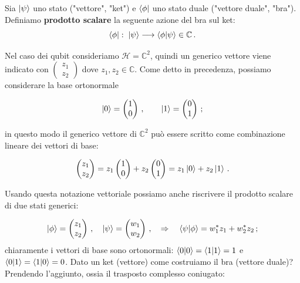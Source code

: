 \begin{definizione}
    Sia $\ket{\psi}$ uno stato ("vettore", "ket") e $\bra{\phi}$ uno stato duale ("vettore duale", "bra"). Definiamo \textbf{prodotto scalare} la seguente azione del bra sul ket: 
    \begin{equation*}
        \bra{\phi}: \; \ket{\psi} \longrightarrow \braket{\phi}{\psi} \in \mathbb{C} \, .
    \end{equation*}
\end{definizione}

\noindent Nel caso dei qubit consideriamo $\mathcal{H} = \mathbb{C}^2$, quindi un generico vettore viene indicato con $\begin{pmatrix} z_1 \\ z_2 \end{pmatrix}$ dove $z_1,z_2\in\mathbb{C}$. Come detto in precedenza, possiamo considerare la base ortonormale

\begin{equation}\label{computational_basis}
    \ket{0} = \begin{pmatrix} 1 \\ 0 \end{pmatrix} \, , \qquad \ket{1} = \begin{pmatrix} 0 \\ 1 \end{pmatrix} \, ;
\end{equation}

\noindent in questo modo il generico vettore di $\mathbb{C}^2$ può essere scritto come combinazione lineare dei vettori di base:

\begin{equation*}
\begin{pmatrix} z_1 \\ z_2 \end{pmatrix} = z_1 \begin{pmatrix} 1 \\ 0 \end{pmatrix} + z_2 \begin{pmatrix} 0 \\ 1 \end{pmatrix} = z_1 \ket{0} + z_2 \ket{1} \, .
\end{equation*}

\noindent Usando questa notazione vettoriale possiamo anche riscrivere il prodotto scalare di due stati generici:

\begin{equation*}
    \ket{\phi} = \begin{pmatrix} z_1 \\ z_2 \end{pmatrix} \, , \quad \ket{\psi} = \begin{pmatrix} w_1 \\ w_2 \end{pmatrix} \, , \quad \Rightarrow \quad \braket{\psi}{\phi}
    =
    w_1^\ast z_1 + w_2^\ast z_2 \, ;
\end{equation*}
\noindent chiaramente i vettori di base sono ortonormali: $\braket{0} = \braket{1}=1$ e $\braket{0}{1} = \braket{1}{0} = 0$. Dato un ket (vettore) come costruiamo il bra (vettore duale)? Prendendo l'aggiunto, ossia il trasposto complesso coniugato:

